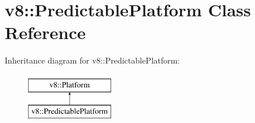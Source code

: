 \hypertarget{classv8_1_1PredictablePlatform}{}\section{v8\+:\+:Predictable\+Platform Class Reference}
\label{classv8_1_1PredictablePlatform}
Inheritance diagram for v8\+:\+:Predictable\+Platform\+:\begin{figure}[H]
\begin{center}
\leavevmode
\includegraphics[height=2.000000cm]{classv8_1_1PredictablePlatform}
\end{center}
\end{figure}

